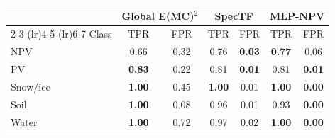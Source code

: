 \begin{tabular}{l cc cc cc}
\toprule
 & \multicolumn{2}{c}{Global E(MC)$^2$} & \multicolumn{2}{c}{SpecTF} & \multicolumn{2}{c}{MLP-NPV} \\
\cmidrule(lr){2-3} \cmidrule(lr){4-5} \cmidrule(lr){6-7}
Class & TPR & FPR & TPR & FPR & TPR & FPR \\
\midrule
NPV & 0.66 & 0.32 & 0.76 & \textbf{0.03} & \textbf{0.77} & 0.06 \\
PV & \textbf{0.83} & 0.22 & 0.81 & \textbf{0.01} & 0.81 & \textbf{0.01} \\
Snow/ice & \textbf{1.00} & 0.45 & \textbf{1.00} & 0.01 & \textbf{1.00} & \textbf{0.00} \\
Soil & \textbf{1.00} & 0.08 & 0.96 & 0.01 & 0.93 & \textbf{0.00} \\
Water & \textbf{1.00} & 0.72 & 0.97 & 0.02 & \textbf{1.00} & \textbf{0.00} \\
\bottomrule
\end{tabular}
